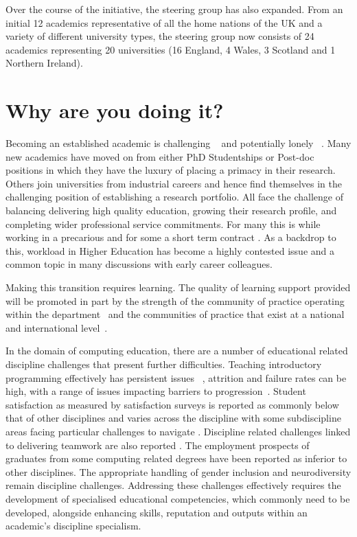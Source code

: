 \documentclass[sigconf]{acmart}
\begin{document}
Over the course of the initiative, the steering group has also expanded. From an initial 12 academics representative of all the home nations of the UK and a variety of different university types, the steering group now consists of 24 academics representing 20 universities (16 England, 4 Wales, 3 Scotland and 1 Northern Ireland). 

\section{Why are you doing it?}
\label{sec:Why}
Becoming an established academic is challenging ~\cite{Thomas2015} and potentially lonely ~\cite{Foote2009}. Many new academics have moved on from either PhD Studentships or Post-doc positions in which they have the luxury of placing a primacy in their research. Others join universities from industrial careers and hence find themselves in the challenging position of establishing a research portfolio. All face the challenge of balancing delivering high quality education, growing their research profile, and completing wider professional service commitments. For many this is while working in a precarious and for some a short term contract \cite{UCU,JaffeS}. As a backdrop to this, workload in Higher Education has become a highly contested issue \cite{UCU2016}and a common topic in many discussions with early career colleagues.

Making this transition requires learning. The quality of learning support provided will be promoted in part by the strength of the community of practice operating within the department~\cite{Bolander2008} and the communities of practice that exist at a national and international level~\cite{Thomas2015}.

In the domain of computing education, there are a number of educational related discipline challenges that present further difficulties. Teaching introductory programming effectively has persistent issues ~\cite{davenport-et-al:latice2016,murphy-et-al:programming2017,simon-et-al:sigcse2018}, attrition and failure rates can be high, with a range of issues impacting barriers to progression~\cite{Watson:2014:FRI:2591708.2591749}. Student satisfaction as measured by satisfaction surveys is reported as commonly below that of other disciplines \cite{Sinclair2015} and varies across the discipline with some subdiscipline areas facing particular challenges to navigate \cite{Knutas2021}. Discipline related challenges linked to delivering teamwork are also reported \cite{Gordon2010,Phillips2021}. The employment prospects of graduates from some computing related degrees have been reported as inferior to other disciplines\cite{shadbolt2016shadbolt}. The appropriate handling of gender inclusion \cite{Winter2021} and neurodiversity \cite{Stuurman2109} remain discipline challenges. Addressing these challenges effectively requires the development of specialised educational competencies, which commonly need to be developed, alongside enhancing skills, reputation and outputs within an academic’s discipline specialism. 
\end{document}
